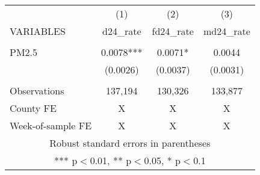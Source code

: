 \begin{tabular}{lccc} \hline
 & (1) & (2) & (3) \\
VARIABLES & d24\_rate & fd24\_rate & md24\_rate \\ \hline
 &  &  &  \\
PM2.5 & 0.0078*** & 0.0071* & 0.0044 \\
 & (0.0026) & (0.0037) & (0.0031) \\
 &  &  &  \\
Observations & 137,194 & 130,326 & 133,877 \\
County FE & X & X & X \\
 Week-of-sample FE & X & X & X \\ \hline
\multicolumn{4}{c}{ Robust standard errors in parentheses} \\
\multicolumn{4}{c}{ *** p$<$0.01, ** p$<$0.05, * p$<$0.1} \\
\end{tabular}
